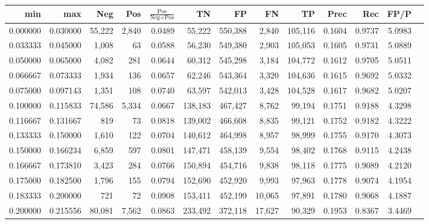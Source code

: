 \begin{tabular}{rrrrrrrrrrrrr}
\toprule
     min &      max &    Neg &    Pos & $\frac{\text{Pos}}{\text{Neg}+\text{Pos}}$ &      TN &      FP &      FN &      TP &   Prec &    Rec &   FP/P \\
\midrule
0.000000 & 0.030000 & 55,222 &  2,840 &                                     0.0489 &  55,222 & 550,388 &   2,840 & 105,116 & 0.1604 & 0.9737 & 5.0983 \\
0.033333 & 0.045000 &  1,008 &     63 &                                     0.0588 &  56,230 & 549,380 &   2,903 & 105,053 & 0.1605 & 0.9731 & 5.0889 \\
0.050000 & 0.065000 &  4,082 &    281 &                                     0.0644 &  60,312 & 545,298 &   3,184 & 104,772 & 0.1612 & 0.9705 & 5.0511 \\
0.066667 & 0.073333 &  1,934 &    136 &                                     0.0657 &  62,246 & 543,364 &   3,320 & 104,636 & 0.1615 & 0.9692 & 5.0332 \\
0.075000 & 0.097143 &  1,351 &    108 &                                     0.0740 &  63,597 & 542,013 &   3,428 & 104,528 & 0.1617 & 0.9682 & 5.0207 \\
0.100000 & 0.115833 & 74,586 &  5,334 &                                     0.0667 & 138,183 & 467,427 &   8,762 &  99,194 & 0.1751 & 0.9188 & 4.3298 \\
0.116667 & 0.131667 &    819 &     73 &                                     0.0818 & 139,002 & 466,608 &   8,835 &  99,121 & 0.1752 & 0.9182 & 4.3222 \\
0.133333 & 0.150000 &  1,610 &    122 &                                     0.0704 & 140,612 & 464,998 &   8,957 &  98,999 & 0.1755 & 0.9170 & 4.3073 \\
0.150000 & 0.166234 &  6,859 &    597 &                                     0.0801 & 147,471 & 458,139 &   9,554 &  98,402 & 0.1768 & 0.9115 & 4.2438 \\
0.166667 & 0.173810 &  3,423 &    284 &                                     0.0766 & 150,894 & 454,716 &   9,838 &  98,118 & 0.1775 & 0.9089 & 4.2120 \\
0.175000 & 0.182500 &  1,796 &    155 &                                     0.0794 & 152,690 & 452,920 &   9,993 &  97,963 & 0.1778 & 0.9074 & 4.1954 \\
0.183333 & 0.200000 &    721 &     72 &                                     0.0908 & 153,411 & 452,199 &  10,065 &  97,891 & 0.1780 & 0.9068 & 4.1887 \\
0.200000 & 0.215556 & 80,081 &  7,562 &                                     0.0863 & 233,492 & 372,118 &  17,627 &  90,329 & 0.1953 & 0.8367 & 3.4469 \\

\end{tabular}
